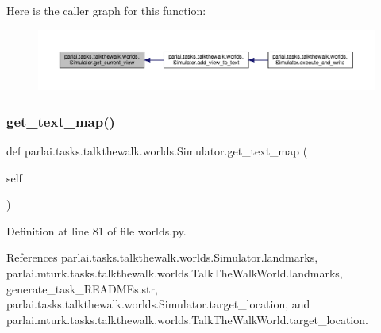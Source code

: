 Here is the caller graph for this function\+:
\nopagebreak
\begin{figure}[H]
\begin{center}
\leavevmode
\includegraphics[width=350pt]{classparlai_1_1tasks_1_1talkthewalk_1_1worlds_1_1Simulator_a5178f95389423f1ee1ad5440e60ad976_icgraph}
\end{center}
\end{figure}
\mbox{\label{classparlai_1_1tasks_1_1talkthewalk_1_1worlds_1_1Simulator_ac582ca2c2642272362fdaf7acd5b4b81}} 
\subsubsection{\texorpdfstring{get\+\_\+text\+\_\+map()}{get\_text\_map()}}
{\footnotesize\ttfamily def parlai.\+tasks.\+talkthewalk.\+worlds.\+Simulator.\+get\+\_\+text\+\_\+map (\begin{DoxyParamCaption}\item[{}]{self }\end{DoxyParamCaption})}



Definition at line 81 of file worlds.\+py.



References parlai.\+tasks.\+talkthewalk.\+worlds.\+Simulator.\+landmarks, parlai.\+mturk.\+tasks.\+talkthewalk.\+worlds.\+Talk\+The\+Walk\+World.\+landmarks, generate\+\_\+task\+\_\+\+R\+E\+A\+D\+M\+Es.\+str, parlai.\+tasks.\+talkthewalk.\+worlds.\+Simulator.\+target\+\_\+location, and parlai.\+mturk.\+tasks.\+talkthewalk.\+worlds.\+Talk\+The\+Walk\+World.\+target\+\_\+location.

\mbox{\label{classparlai_1_1tasks_1_1talkthewalk_1_1worlds_1_1Simulator_a0bd93cb7b6958af1795e6c0adf47cb4d}} 
